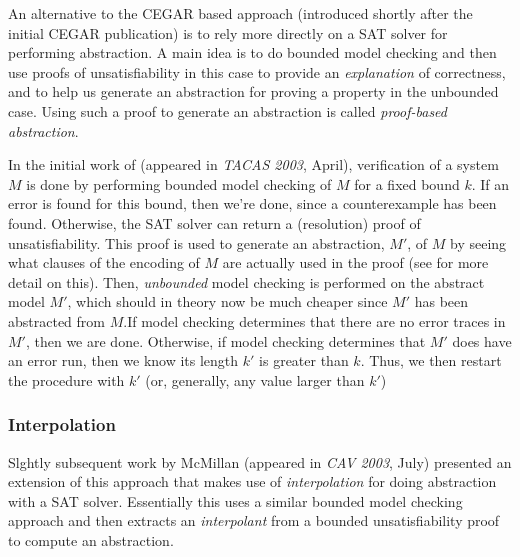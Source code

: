 \documentclass[10pt,a4paper]{article}
\begin{document}
An alternative to the CEGAR based approach (introduced shortly after the initial CEGAR publication) is to rely more directly on a SAT solver for performing abstraction. A main idea is to do bounded model checking and then use proofs of unsatisfiability in this case to provide an \textit{explanation} of correctness, and to help us generate an abstraction for proving a property in the unbounded case. Using such a proof to generate an abstraction is called \textit{proof-based abstraction}\cite{2003abswithoutcex}. 

In the initial work of \cite{2003abswithoutcex} (appeared in \textit{TACAS 2003}, April), verification of a system $M$ is done by performing bounded model checking of $M$ for  a fixed bound $k$. If an error is found for this bound, then we're done, since a counterexample has been found. Otherwise, the SAT solver can return a (resolution) proof of unsatisfiability. This proof is used to generate an abstraction, $M'$, of $M$ by seeing what clauses of the encoding of $M$ are actually used in the proof (see \cite{2003abswithoutcex} for more detail on this). Then, \textit{unbounded} model checking is performed on the abstract model $M'$, which should in theory now be much cheaper since $M'$ has been abstracted from $M$.If model checking determines that there are no error traces in $M'$, then we are done. Otherwise, if model checking determines that $M'$ does have an error run, then we know its length $k'$ is greater than $k$. Thus, we then restart the procedure with $k'$ (or, generally, any value larger than $k'$)

\subsubsection*{Interpolation}

Slghtly subsequent work by McMillan \cite{2003satinterp} (appeared in \textit{CAV 2003}, July) presented an extension of this approach that makes use of \textit{interpolation} for doing abstraction with a SAT solver. Essentially this uses a similar bounded model checking approach and then extracts an \textit{interpolant} from a bounded unsatisfiability proof to compute an abstraction.
\end{document}
